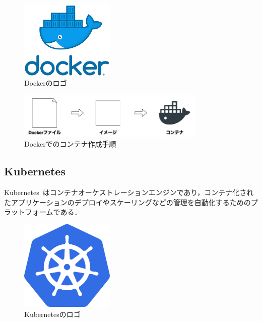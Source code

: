 \begin{figure}[htbp]
\begin{center}
    \includegraphics[width=0.4\textwidth]{./figures/docker-logo.png}
    \caption{Dockerのロゴ}
\end{center}
\end{figure}

\begin{figure}[htbp]
\begin{center}
    \includegraphics[width=0.8\textwidth]{./figures/docker-process.jpg}
    \caption{Dockerでのコンテナ作成手順}
\end{center}
\end{figure}

\subsection{Kubernetes}
\label{background:container-orchestration-system:kubernetes}

Kubernetes~\cite{Kubernetes}はコンテナオーケストレーションエンジンであり，コンテナ化されたアプリケーションのデプロイやスケーリングなどの管理を自動化するためのプラットフォームである．

\begin{figure}[htbp]
\begin{center}
    \includegraphics[width=0.4\textwidth]{./figures/kubernetes_logo.png}
    \caption{Kubernetesのロゴ}
\end{center}
\end{figure}

